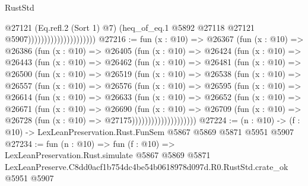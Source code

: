 \begin{lexlean}{RustStd}
\begin{coremodule}
                                            @27121
                                            (Eq.refl.{2} (Sort 1) @7)
                                            (heq_of_eq.{1}
                                              @5892
                                              @27118
                                              @27121
                                              @5907)))))))))))))))))))))
@27216 := fun (x : @10) =>
  @26367
    (fun (x : @10) =>
    @26386
      (fun (x : @10) =>
      @26405
        (fun (x : @10) =>
        @26424
          (fun (x : @10) =>
          @26443
            (fun (x : @10) =>
            @26462
              (fun (x : @10) =>
              @26481
                (fun (x : @10) =>
                @26500
                  (fun (x : @10) =>
                  @26519
                    (fun (x : @10) =>
                    @26538
                      (fun (x : @10) =>
                      @26557
                        (fun (x : @10) =>
                        @26576
                          (fun (x : @10) =>
                          @26595
                            (fun (x : @10) =>
                            @26614
                              (fun (x : @10) =>
                              @26633
                                (fun (x : @10) =>
                                @26652
                                  (fun (x : @10) =>
                                  @26671
                                    (fun (x : @10) =>
                                    @26690
                                      (fun (x : @10) =>
                                      @26709
                                        (fun (x : @10) =>
                                        @26728 (fun (x : @10) => @27175))))))))))))))))))))
@27224 := (n : @10) -> (f : @10) -> LexLeanPreservation.Rust.FunSem @5867 @5869 @5871 @5951 @5907
@27234 := fun (n : @10) =>
  fun (f : @10) =>
  LexLeanPreservation.Rust.simulate
    @5867
    @5869
    @5871
    LexLeanPreserve.C8dd0acf1b754dc4be54b0618978d097d.R0.RustStd.crate_ok
    @5951
    @5907
\end{coremodule}
\end{lexlean}
